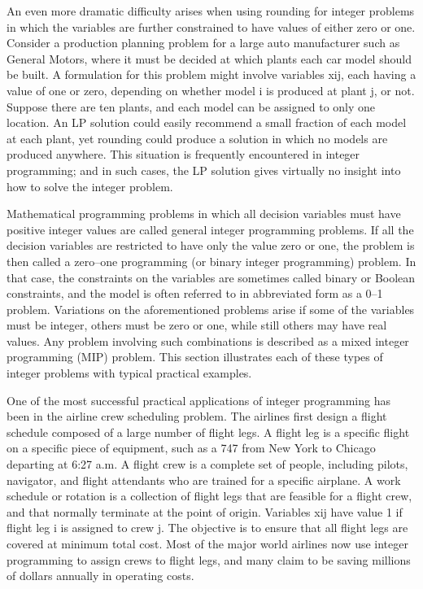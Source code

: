 \documentclass[c]{beamer}
\begin{document}
An even more dramatic difficulty arises when using rounding for integer problems in which the variables are further constrained to have values of either zero or one. Consider a production planning problem for a large auto manufacturer such as General Motors, where it must be decided at which plants each car model should be built. A formulation for this problem might involve variables xij, each having a value of one or zero, depending on whether model i is produced at plant j, or not. Suppose there are ten plants, and each model can be assigned to only one location. An LP solution could easily recommend a small fraction of each model at each plant, yet rounding could produce a solution in which no models are produced anywhere. This situation is frequently encountered in integer programming; and in such cases, the LP solution gives virtually no insight into how to solve the integer problem.

Mathematical programming problems in which all decision variables must have positive integer values are called general integer programming problems. If all the decision variables are restricted to have only the value zero or one, the problem is then called a zero–one programming (or binary integer programming) problem. In that case, the constraints on the variables are sometimes called binary or Boolean constraints, and the model is often referred to in abbreviated form as a 0–1 problem. Variations on the aforementioned problems arise if some of the variables must be integer, others must be zero or one, while still others may have real values. Any problem involving such combinations is described as a mixed integer programming (MIP) problem. This section illustrates each of these types of integer problems with typical practical examples.

One of the most successful practical applications of integer programming has been in the airline crew scheduling problem. The airlines first design a flight schedule composed of a large number of flight legs. A flight leg is a specific flight on a specific piece of equipment, such as a 747 from New York to Chicago departing at 6:27 a.m. A flight crew is a complete set of people, including pilots, navigator, and flight attendants who are trained for a specific airplane. A work schedule or rotation is a collection of flight legs that are feasible for a flight crew, and that normally terminate at the point of origin. Variables xij have value 1 if flight leg i is assigned to crew j. The objective is to ensure that all flight legs are covered at minimum total cost. Most of the major world airlines now use integer programming to assign crews to flight legs, and many claim to be saving millions of dollars annually in operating costs.
\end{document}
